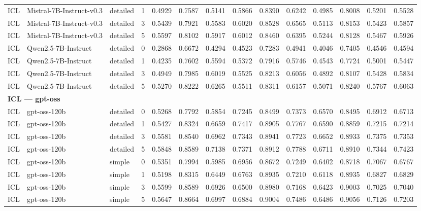 \begin{longtable}{l l l r r r r r r r r r r r}
ICL & Mistral-7B-Instruct-v0.3 & detailed & 1 & 0.4929 & 0.7587 & 0.5141 & 0.5866 & 0.8390 & 0.6242 & 0.4985 & 0.8008 & 0.5201 & 0.5528 \\
ICL & Mistral-7B-Instruct-v0.3 & detailed & 3 & 0.5439 & 0.7921 & 0.5583 & 0.6020 & 0.8528 & 0.6565 & 0.5113 & 0.8153 & 0.5423 & 0.5857 \\
ICL & Mistral-7B-Instruct-v0.3 & detailed & 5 & 0.5597 & 0.8102 & 0.5917 & 0.6012 & 0.8460 & 0.6395 & 0.5244 & 0.8128 & 0.5467 & 0.5926 \\
ICL & Qwen2.5-7B-Instruct & detailed & 0 & 0.2868 & 0.6672 & 0.4294 & 0.4523 & 0.7283 & 0.4941 & 0.4046 & 0.7405 & 0.4546 & 0.4594 \\
ICL & Qwen2.5-7B-Instruct & detailed & 1 & 0.4235 & 0.7602 & 0.5594 & 0.5372 & 0.7916 & 0.5746 & 0.4543 & 0.7724 & 0.5001 & 0.5447 \\
ICL & Qwen2.5-7B-Instruct & detailed & 3 & 0.4949 & 0.7985 & 0.6019 & 0.5525 & 0.8213 & 0.6056 & 0.4892 & 0.8107 & 0.5428 & 0.5834 \\
ICL & Qwen2.5-7B-Instruct & detailed & 5 & 0.5270 & 0.8222 & 0.6265 & 0.5511 & 0.8311 & 0.6157 & 0.5071 & 0.8240 & 0.5767 & 0.6063 \\
\hline\hline
\multicolumn{14}{l}{\textbf{ICL — gpt-oss}} \\
\hline
ICL & gpt-oss-120b & detailed & 0 & 0.5268 & 0.7792 & 0.5854 & 0.7245 & 0.8499 & 0.7373 & 0.6570 & 0.8495 & 0.6912 & 0.6713 \\
ICL & gpt-oss-120b & detailed & 1 & 0.5427 & 0.8324 & 0.6659 & 0.7417 & 0.8905 & 0.7767 & 0.6590 & 0.8859 & 0.7215 & 0.7214 \\
ICL & gpt-oss-120b & detailed & 3 & 0.5581 & 0.8540 & 0.6962 & 0.7343 & 0.8941 & 0.7723 & 0.6652 & 0.8933 & 0.7375 & 0.7353 \\
ICL & gpt-oss-120b & detailed & 5 & 0.5848 & 0.8589 & 0.7138 & 0.7371 & 0.8912 & 0.7788 & 0.6711 & 0.8910 & 0.7344 & 0.7423 \\
ICL & gpt-oss-120b & simple & 0 & 0.5351 & 0.7994 & 0.5985 & 0.6956 & 0.8672 & 0.7249 & 0.6402 & 0.8718 & 0.7067 & 0.6767 \\
ICL & gpt-oss-120b & simple & 1 & 0.5198 & 0.8315 & 0.6449 & 0.6763 & 0.8935 & 0.7210 & 0.6118 & 0.8935 & 0.6827 & 0.6829 \\
ICL & gpt-oss-120b & simple & 3 & 0.5599 & 0.8589 & 0.6926 & 0.6500 & 0.8980 & 0.7168 & 0.6423 & 0.9003 & 0.7025 & 0.7040 \\
ICL & gpt-oss-120b & simple & 5 & 0.5647 & 0.8664 & 0.6997 & 0.6884 & 0.9004 & 0.7486 & 0.6486 & 0.9056 & 0.7126 & 0.7203 \\
\hline\hline
\end{longtable}